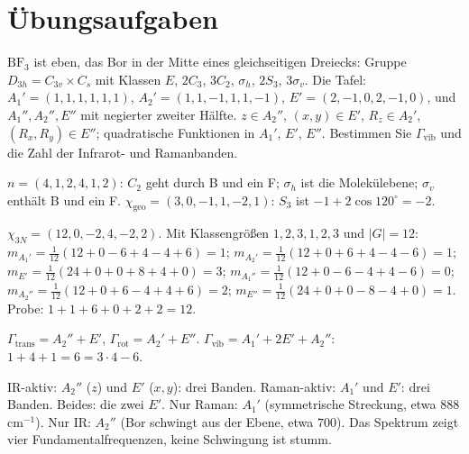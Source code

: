 \section{Übungsaufgaben}

\begin{aufgabe}
$\mathrm{BF_3}$ ist eben, das Bor in der Mitte eines gleichseitigen Dreiecks: Gruppe $D_{3h} = C_{3v}\times C_s$ mit Klassen $E$, $2C_3$, $3C_2$, $\sigma_h$, $2S_3$, $3\sigma_v$. Die Tafel: $A_1' = (1, 1, 1, 1, 1, 1)$, $A_2' = (1, 1, -1, 1, 1, -1)$, $E' = (2, -1, 0, 2, -1, 0)$, und $A_1'', A_2'', E''$ mit negierter zweiter Hälfte. $z\in A_2''$, $(x, y)\in E'$, $R_z\in A_2'$, $(R_x, R_y)\in E''$; quadratische Funktionen in $A_1'$, $E'$, $E''$. Bestimmen Sie $\Gamma_{\mathrm{vib}}$ und die Zahl der Infrarot- und Ramanbanden.

\loesung
{}
$n = (4, 1, 2, 4, 1, 2)$: $C_2$ geht durch B und ein F; $\sigma_h$ ist die Molekülebene; $\sigma_v$ enthält B und ein F. $\chi_{\mathrm{geo}} = (3, 0, -1, 1, -2, 1)$: $S_3$ ist $-1 + 2\cos120^{\circ} = -2$.

$\chi_{3N} = (12, 0, -2, 4, -2, 2)$. Mit Klassengrößen $1, 2, 3, 1, 2, 3$ und $|G| = 12$:
$m_{A_1'} = \frac1{12}(12 + 0 - 6 + 4 - 4 + 6) = 1$;
$m_{A_2'} = \frac1{12}(12 + 0 + 6 + 4 - 4 - 6) = 1$;
$m_{E'} = \frac1{12}(24 + 0 + 0 + 8 + 4 + 0) = 3$;
$m_{A_1''} = \frac1{12}(12 + 0 - 6 - 4 + 4 - 6) = 0$;
$m_{A_2''} = \frac1{12}(12 + 0 + 6 - 4 + 4 + 6) = 2$;
$m_{E''} = \frac1{12}(24 + 0 + 0 - 8 - 4 + 0) = 1$.
Probe: $1 + 1 + 6 + 0 + 2 + 2 = 12$. \checkmark

$\Gamma_{\mathrm{trans}} = A_2'' + E'$, $\Gamma_{\mathrm{rot}} = A_2' + E''$. $\Gamma_{\mathrm{vib}} = A_1' + 2E' + A_2''$: $1 + 4 + 1 = 6 = 3\cdot4 - 6$. \checkmark

IR-aktiv: $A_2''$ ($z$) und $E'$ ($x, y$): drei Banden. Raman-aktiv: $A_1'$ und $E'$: drei Banden. Beides: die zwei $E'$. Nur Raman: $A_1'$ (symmetrische Streckung, etwa $888$ cm$^{-1}$). Nur IR: $A_2''$ (Bor schwingt aus der Ebene, etwa $700$). Das Spektrum zeigt vier Fundamentalfrequenzen, keine Schwingung ist stumm.

\begin{center}
\begin{minipage}{0.88\textwidth}
\end{minipage}
\end{center}
\end{aufgabe}

